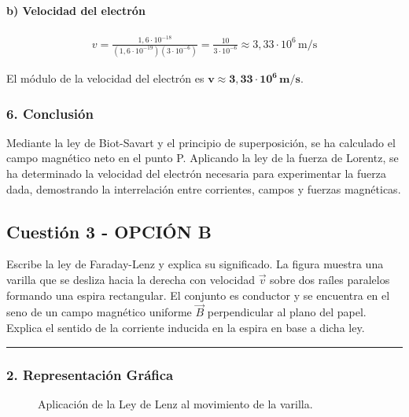 \paragraph{b) Velocidad del electrón}
\begin{gather}
    v = \frac{1,6\cdot10^{-18}}{(1,6\cdot10^{-19})(3\cdot10^{-6})} = \frac{10}{3\cdot10^{-6}} \approx 3,33\cdot10^6\,\text{m/s}
\end{gather}
\begin{cajaresultado}
El módulo de la velocidad del electrón es $\boldsymbol{v \approx 3,33\cdot10^6\,\textbf{m/s}}$.
\end{cajaresultado}
\subsubsection*{6. Conclusión}
\begin{cajaconclusion}
Mediante la ley de Biot-Savart y el principio de superposición, se ha calculado el campo magnético neto en el punto P. Aplicando la ley de la fuerza de Lorentz, se ha determinado la velocidad del electrón necesaria para experimentar la fuerza dada, demostrando la interrelación entre corrientes, campos y fuerzas magnéticas.
\end{cajaconclusion}
\newpage

\subsection{Cuestión 3 - OPCIÓN B}
\label{subsec:3B_2019_jun_ord}
\begin{cajaenunciado}
Escribe la ley de Faraday-Lenz y explica su significado. La figura muestra una varilla que se desliza hacia la derecha con velocidad $\vec{v}$ sobre dos raíles paralelos formando una espira rectangular. El conjunto es conductor y se encuentra en el seno de un campo magnético uniforme $\vec{B}$ perpendicular al plano del papel. Explica el sentido de la corriente inducida en la espira en base a dicha ley.
\end{cajaenunciado}
\hrule
\subsubsection*{2. Representación Gráfica}
\begin{figure}[H]
    \centering
    \caption{Aplicación de la Ley de Lenz al movimiento de la varilla.}
\end{figure}
